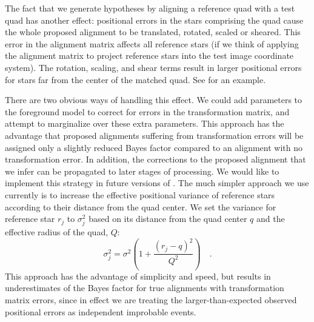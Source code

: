 The fact that we generate hypotheses by aligning a reference quad with
a test quad has another effect: positional errors in the stars
comprising the quad cause the whole proposed alignment to be
translated, rotated, scaled or sheared.  This error in the alignment
matrix affects all reference stars (if we think of applying the
alignment matrix to project reference stars into the test image
coordinate system).  The rotation, scaling, and shear terms result in
larger positional errors for stars far from the center of the matched
quad.  See  for an example.


There are two obvious ways of handling this effect.  We could add
parameters to the foreground model to correct for errors in the
transformation matrix, and attempt to marginalize over these extra
parameters.  This approach has the advantage that proposed alignments
suffering from transformation errors will be assigned only a slightly
reduced Bayes factor compared to an alignment with no transformation
error.  In addition, the corrections to the proposed alignment that we
infer can be propagated to later stages of processing.  We would like
to implement this strategy in future versions of \an.  The much
simpler approach we use currently is to increase the effective
positional variance of reference stars according to their distance
from the quad center.  We set the variance for reference star $r_j$ to
$\sigma^2_j$ based on its distance from the quad center $q$ and the
effective radius of the quad, $Q$:
\begin{equation}
  \sigma^2_j = \sigma^2 \left( 1 + \frac{(r_j - q)^2}{Q^2} \right)
  \label{eq:growingsigma}
  \quad .
\end{equation}
This approach has the advantage of simplicity and speed, but results
in underestimates of the Bayes factor for true alignments with
transformation matrix errors, since in effect we are treating the
larger-than-expected observed positional errors as independent
improbable events.


